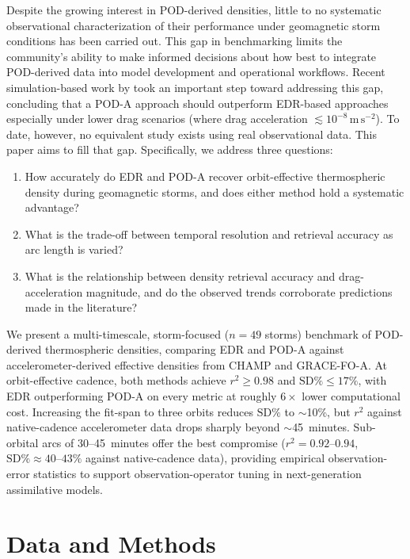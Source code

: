 \documentclass[draft]{agujournal2019}
\begin{document}
Despite the growing interest in POD-derived densities, little to no systematic observational characterization of their performance under geomagnetic storm conditions has been carried out. This gap in benchmarking limits the community’s ability to make informed decisions about how best to integrate POD-derived data into model development and operational workflows. Recent simulation-based work by  took an important step toward addressing this gap, concluding that a POD-A approach should outperform EDR-based approaches especially under lower drag scenarios (where drag acceleration $\lesssim 10^{-8}\,\mathrm{m\,s^{-2}}$). To date, however, no equivalent study exists using real observational data. This paper aims to fill that gap. Specifically, we address three questions:
\begin{enumerate}
  \item How accurately do EDR and POD-A recover orbit-effective thermospheric density during geomagnetic storms, and does either method hold a systematic advantage?
  \item What is the trade-off between temporal resolution and retrieval accuracy as arc length is varied?
  \item What is the relationship between density retrieval accuracy and drag-acceleration magnitude, and do the observed trends corroborate predictions made in the literature?
\end{enumerate}

We present a multi-timescale, storm-focused ($n=49$ storms) benchmark of POD-derived thermospheric densities, comparing EDR and POD-A against accelerometer-derived effective densities from CHAMP and GRACE-FO-A. At orbit-effective cadence, both methods achieve $r^{2} \geq 0.98$ and $\text{SD\%} \leq 17\%$, with EDR outperforming POD-A on every metric at roughly $6\times$ lower computational cost. Increasing the fit-span to three orbits reduces $\text{SD\%}$ to $\sim$10\%, but $r^{2}$ against native-cadence accelerometer data drops sharply beyond $\sim$45~minutes. Sub-orbital arcs of 30--45~minutes offer the best compromise ($r^{2} = 0.92$--$0.94$, $\text{SD\%} \approx 40$--$43\%$ against native-cadence data), providing empirical observation-error statistics to support observation-operator tuning in next-generation assimilative models.

\section{Data and Methods}
\end{document}
